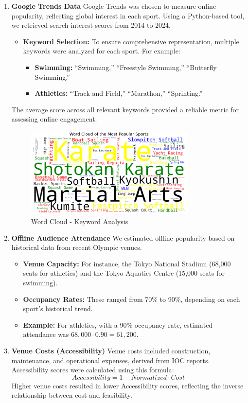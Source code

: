 \documentclass[12pt]{article}
\begin{document}
\begin{enumerate}
    \item \textbf{Google Trends Data}
    Google Trends was chosen to measure online popularity, reflecting global interest in each sport. Using a Python-based tool, we retrieved search interest scores from 2014 to 2024.
    \begin{itemize}
    \item \textbf{Keyword Selection:}
     To ensure comprehensive representation, multiple keywords were analyzed for each sport. For example:
         \begin{itemize}
             \item \textbf{Swimming:} “Swimming,” “Freestyle Swimming,” “Butterfly Swimming.”
             \item \textbf{Athletics:} “Track and Field,” “Marathon,” “Sprinting.” 
         \end{itemize}
    \end{itemize}

    The average score across all relevant keywords provided a reliable metric for assessing online engagement.
    \begin{figure}[]
        \centering
        \includegraphics[width=0.8\textwidth]{Word Cloud.png}
        \caption{Word Cloud - Keyword Analysis \label{fig:Word Cloud}}
    \end{figure}

    \item \textbf{Offline Audience Attendance}
    We estimated offline popularity based on historical data from recent Olympic venues.
    \begin{itemize}
        \item \textbf{Venue Capacity:} For instance, the Tokyo National Stadium (68,000 seats for athletics) and the Tokyo Aquatics Centre (15,000 seats for swimming).
        \item \textbf{Occupancy Rates:} These ranged from 70\% to 90\%, depending on each sport's historical trend.
        \item \textbf{Example:} For athletics, with a 90\% occupancy rate, estimated attendance was \(68,000 \cdot 0.90=61,200\).
    \end{itemize}
    \item \textbf{Venue Costs (Accessibility)} 
    Venue costs included construction, maintenance, and operational expenses, derived from IOC reports. Accessibility scores were calculated using this formula:
    \[
    Accessibility = 1 - Normalized \cdot Cost
    \]
    Higher venue costs resulted in lower Accessibility scores, reflecting the inverse relationship between cost and feasibility.
\end{enumerate}
\end{document}
